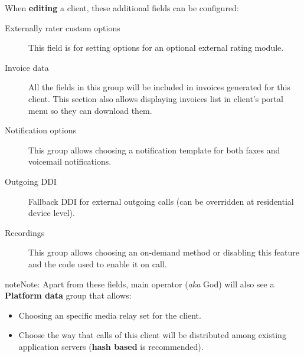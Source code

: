\documentclass[letterpaper,10pt,english]{sphinxmanual}
\begin{document}
When \textbf{editing} a client, these additional fields can be configured:
\begin{description}
\item[{Externally rater custom options}] \leavevmode{}\label{administration_portal/brand/clients/residential:term-externally-rater-custom-options}
This field is for setting options for an optional external rating module.

\item[{Invoice data}] \leavevmode{}\label{administration_portal/brand/clients/residential:term-invoice-data}
All the fields in this group will be included in invoices generated for this client. This section also allows
displaying invoices list in client's portal menu so they can download them.

\item[{Notification options}] \leavevmode{}\label{administration_portal/brand/clients/residential:term-notification-options}
This group allows choosing a notification template for both faxes and voicemail notifications.

\item[{Outgoing DDI}] \leavevmode{}\label{administration_portal/brand/clients/residential:term-outgoing-ddi}
Fallback DDI for external outgoing calls (can be overridden at residential device level).

\item[{Recordings}] \leavevmode{}\label{administration_portal/brand/clients/residential:term-recordings}
This group allows choosing an on-demand method or disabling this feature and the code used to enable it on call.

\end{description}

\begin{notice}{note}{Note:}
Apart from these fields, main operator (\emph{aka} God) will also see a \textbf{Platform data} group that allows:
\begin{itemize}
\item {} 
Choosing an specific media relay set for the client.

\item {} 
Choose the way that calls of this client will be distributed among existing application servers (\textbf{hash based} is recommended).

\end{itemize}
\end{notice}
\end{document}

